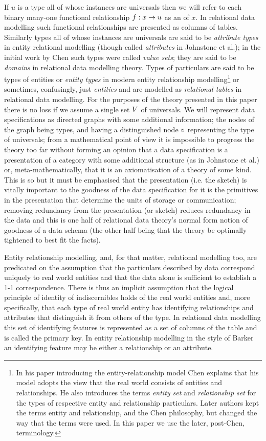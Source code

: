 If $u$ is a type all of whose instances are universals then we will refer to each binary many-one functional relationship $f: x \rightarrow u$ as an  of $x$. In relational data modelling such functional relationships are presented as columns of tables. Similarly types all of whose instances are universals  are said to be \textit{attribute types} in entity relational modelling  (though called \textit{attributes} in Johnstone et al.); in the initial work by Chen such types were called \textit{value sets}; they are said to be \textit{domains} in relational data modelling theory. Types of particulars are said to be types of entities or \textit{entity types} in modern entity relationship modelling\footnote{In  his paper  introducing the entity-relationship model Chen explains that his model adopts the view that the real world consists of entities and relationships. He also introduces the  terms \textit{entity set} and \textit{relationship set} for the types of respective entity and relationship particulars. Later authors kept the terms entity and relationship, and the Chen philosophy, but changed the way that the terms were used. In this paper we use the later, post-Chen, terminology.} or sometimes, confusingly, just \textit{entities}  and are modelled as \textit{relational tables} in relational data modelling. For the purposes of the theory presented in this paper there is no loss if we assume a single set $V$ of universals.  We will represent data specifications as directed graphs with some additional information; the nodes of the graph being types, and having a distinguished node $v$ representing the type of universals; from a mathematical point of view it is impossible to progress the theory too far without forming an opinion that a data specification is a presentation of a category with some additional structure (as in Johnstone et al.) or, meta-mathematically, that it is an axiomatisation of a theory of some kind. This is so but it must be emphasised that the presentation (i.e. the sketch) is vitally important to the goodness of the data specification for it is the primitives in the presentation that determine the units of storage or communication; removing redundancy from the presentation (or sketch) reduces redundancy in the data and this is one half of relational data theory's  normal form notion of goodness of a data schema (the other half being that the theory be optimally tightened to best fit the facts).

Entity relationship modelling, and, for that matter, relational modelling too, are predicated on the assumption that the particulars described by data correspond uniquely to real world entities and that the data alone is sufficient to establish a 1-1 correspondence. There is thus an implicit assumption that the logical principle of identity of indiscernibles holds of the real world entities and, more specifically, that each type of real world entity has identifying relationships and attributes that distinguish it from  others of the type. In relational data modelling this set of identifying features is represented as a set of columns of the table and is called the primary key. In entity relationship modelling in the style of Barker an identifying feature may be either a relationship or an attribute.   

